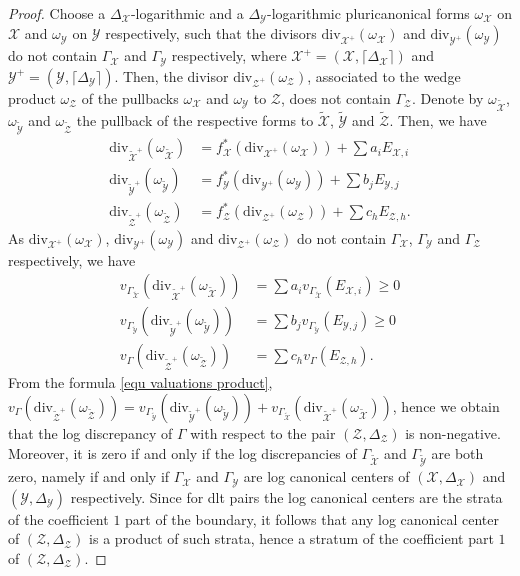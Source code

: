 \documentclass{amsart}%
\numberwithin{equation}{subsection}
\theoremstyle{plain2}
\theoremstyle{definition2}
\theoremstyle{stepstyle}
\theoremstyle{point}
\theoremstyle{subpoint}
\newcommand{\cX}{\ensuremath{\mathscr{X}}}
\newcommand{\cY}{\ensuremath{\mathscr{Y}}}
\newcommand{\cZ}{\ensuremath{\mathscr{Z}}}
\renewcommand{\cY}{\ensuremath{\mathscr{Y}}}
\newcommand{\divisor}{\mathrm{div}}
\begin{document}
\begin{proof}
Choose a $\Delta_{\cX}$-logarithmic and a $\Delta_{\cY}$-logarithmic pluricanonical forms $\omega_{\cX}$ on $\cX$ and  $\omega_{\cY}$ on $\cY$ respectively, such that the divisors $\divisor_{\cX^+}(\omega_\cX)$ and $\divisor_{\cY^+}(\omega_{\cY})$ do not contain $\Gamma_\cX$ and $\Gamma_\cY$ respectively, where $\cX^+=(\cX,\lceil \Delta_{\cX}\rceil)$ and  $\cY^+=(\cY,\lceil \Delta_{\cY}\rceil)$. Then, the divisor $\divisor_{\cZ^+}(\omega_{\cZ})$, associated to the wedge product $\omega_{\cZ}$ of the pullbacks $\omega_{\cX}$ and $\omega_{\cY}$ to $\cZ$, does not contain $\Gamma_{\cZ}$.  Denote by $\omega_{\widetilde{\cX}}$, $\omega_{\widetilde{\cY}}$ and $\omega_{\widetilde{\cZ}}$ the pullback of the respective forms to $\widetilde{\cX}$, $\widetilde{\cY}$ and $\widetilde{\cZ}$. Then, we have 
\begin{align*}
\divisor_{\widetilde{\cX}^+} (\omega_{\widetilde{\cX}})&  = f_\cX^*(\divisor_{\cX^+}(\omega_\cX)) + \sum a_i E_{\cX,i} \\
\divisor_{\widetilde{\cY}^+} (\omega_{\widetilde{\cY}})&  = f_\cY^*(\divisor_{\cY^+}(\omega_\cY)) +  \sum b_j E_{\cY,j}\\
\divisor_{\widetilde{\cZ}^+} (\omega_{\widetilde{\cZ}})&  = f_\cZ^*(\divisor_{\cZ^+}(\omega_\cZ)) +  \sum c_h E_{\cZ,h}.
\end{align*} As $\divisor_{\cX^+}(\omega_\cX)$, $\divisor_{\cY^+}(\omega_{\cY})$ and $\divisor_{\cZ^+}(\omega_{\cZ})$ do not contain $\Gamma_\cX$, $\Gamma_\cY$ and $\Gamma_{\cZ}$ respectively, we have
\begin{align*}
v_{\Gamma_{\widetilde{\cX}}}(\divisor_{\widetilde{\cX}^+} (\omega_{\widetilde{\cX}}))&  = \sum a_i v_{\Gamma_{\widetilde{\cX}}}(E_{\cX,i}) \geqslant 0 \\
v_{\Gamma_{\widetilde{\cY}}}(\divisor_{\widetilde{\cY}^+} (\omega_{\widetilde{\cY}}))&  = \sum b_j v_{\Gamma_{\widetilde{\cY}}}(E_{\cY,j}) \geqslant 0\\
v_{\Gamma}(\divisor_{\widetilde{\cZ}^+} (\omega_{\widetilde{\cZ}}))&  = \sum c_h v_{\Gamma}( E_{\cZ,h}).
\end{align*}
From the formula \ref{equ valuations product},  $v_{\Gamma}(\divisor_{\widetilde{\cZ}^+} (\omega_{\widetilde{\cZ}}))= v_{\Gamma_{\widetilde{\cY}}}(\divisor_{\widetilde{\cY}^+} (\omega_{\widetilde{\cY}}))+ v_{\Gamma_{\widetilde{\cX}}}(\divisor_{\widetilde{\cX}^+} (\omega_{\widetilde{\cX}}))$, hence we obtain that the log discrepancy of $\Gamma$ with respect to the pair $(\cZ,\Delta_{\cZ})$ is non-negative. Moreover, it is zero if and only if the log discrepancies of $\Gamma_{\widetilde{\cX}}$ and $\Gamma_{\widetilde{\cY}}$ are both zero, namely if and only if $\Gamma_\cX$ and $\Gamma_{\cY}$ are log canonical centers of $(\cX,\Delta_{\cX})$ and $(\cY,\Delta_{\cY})$ respectively. Since for dlt pairs the log canonical centers are the strata of the coefficient $1$ part of the boundary, it follows that any log canonical center of $(\cZ,\Delta_{\cZ})$ is a product of such strata, hence a stratum of the coefficient part $1$ of $(\cZ,\Delta_{\cZ})$.
\end{proof}
\end{document}
